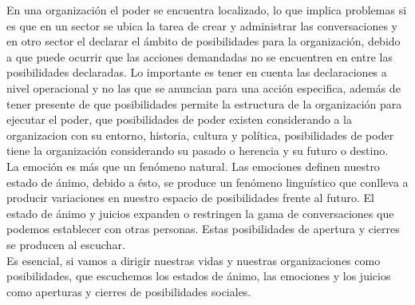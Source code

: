 En una organizaci\'on el poder se encuentra localizado, lo que implica problemas si es que en un sector se ubica la tarea de crear y administrar las conversaciones y en otro sector el declarar el \'ambito de posibilidades para la organizaci\'on, debido a que puede ocurrir que las acciones demandadas no se encuentren en entre las posibilidades declaradas. Lo importante es tener en cuenta las declaraciones a nivel operacional y no las que se anuncian para una acci\'on especifica, adem\'as de tener presente de que posibilidades permite la estructura de la organizaci\'on para ejecutar el poder, que posibilidades de poder existen considerando a la organizacion con su entorno, historia, cultura y pol\'itica, posibilidades de poder tiene la organizaci\'on considerando su pasado o herencia y su futuro o destino. \\

La emoci\'on es m\'as que un fen\'omeno natural. Las emociones definen nuestro estado de \'animo, debido a \'esto, se produce un fen\'omeno lingu\'istico que conlleva a producir variaciones en nuestro espacio de posibilidades frente al futuro. El estado de \'animo y juicios expanden o restringen la gama de conversaciones que podemos establecer con otras personas. Estas posibilidades de apertura y cierres se producen al escuchar. \\

Es esencial, si vamos a dirigir nuestras vidas y nuestras organizaciones como posibilidades, que escuchemos los estados de \'animo, las emociones y los juicios como aperturas y cierres de posibilidades sociales. \\

\vspace{14cm}
